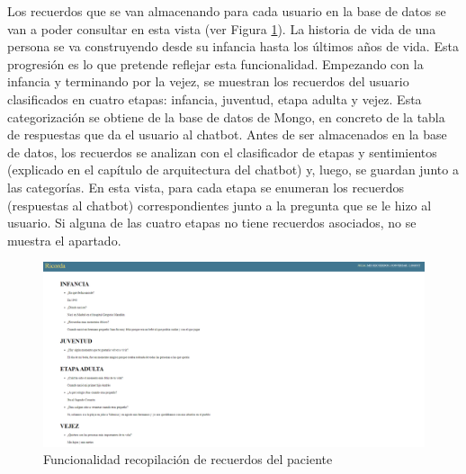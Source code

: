 Los recuerdos que se van almacenando para cada usuario en la base de datos se van a poder consultar en esta vista (ver Figura \ref{fig:funcionalidadhistoriavida}). La historia de vida de una persona se va construyendo desde su infancia hasta los últimos años de vida. Esta progresión es lo que pretende reflejar esta funcionalidad. Empezando con la infancia y terminando por la vejez, se muestran los recuerdos del usuario clasificados en cuatro etapas: infancia, juventud, etapa adulta y vejez. Esta categorización se obtiene de la base de datos de Mongo, en concreto de la tabla de respuestas que da el usuario al chatbot. Antes de ser almacenados en la base de datos, los recuerdos se analizan con el clasificador de etapas y sentimientos (explicado en el capítulo de arquitectura del chatbot) y, luego, se guardan junto a las categorías. En esta vista, para cada etapa se enumeran los recuerdos (respuestas al chatbot) correspondientes junto a la pregunta que se le hizo al usuario. Si alguna de las cuatro etapas no tiene recuerdos asociados, no se muestra el apartado. 

\begin{figure}[h]
	\centering
	\includegraphics[scale=0.45]{Imagenes/Vectorial/funcionalidad_historia_vida}
	\caption{Funcionalidad recopilación de recuerdos del paciente}
	\label{fig:funcionalidadhistoriavida}
\end{figure}




